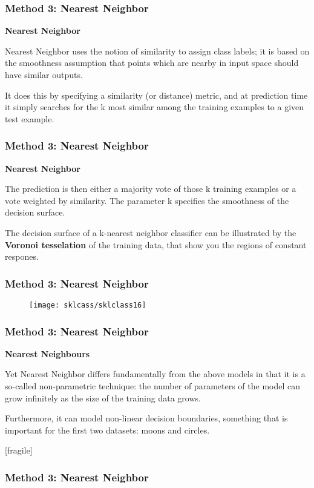 \documentclass[MASTER.tex]{subfiles}
\begin{document}
 

 
 \frametitle{Method 3: Nearest Neighbor}
 
\textbf{Nearest Neighbor}
 
\item Nearest Neighbor uses the notion of similarity to assign class labels; it is based on the smoothness assumption that points which are nearby in input space should have similar outputs.
\item  It does this by specifying a similarity (or distance) metric, and at prediction time it simply searches for the k most similar among the training examples to a given test example.
 
 

 
  \frametitle{Method 3: Nearest Neighbor}
  
 \textbf{Nearest Neighbor}
   
   The prediction is then either a majority vote of those k training examples or a vote weighted by similarity.  The parameter k specifies the smoothness of the decision surface.\item  The decision surface of a k-nearest neighbor classifier can be illustrated by the \textbf{Voronoi tesselation} of the training data, that show you the regions of constant respones.
 
 
 
  \frametitle{Method 3: Nearest Neighbor}
 \begin{figure}
  \centering
  \texttt{[image: sklcass/sklclass16]}
 
 \end{figure}
 
 
 
  \frametitle{Method 3: Nearest Neighbor}
   
 \textbf{Nearest Neighbours}
  
\item  Yet Nearest Neighbor differs fundamentally from the above models in that it is a so-called non-parametric technique: the number of parameters of the model can grow infinitely as the size of the training data grows. 
\item Furthermore, it can model non-linear decision boundaries, something that is important for the first two datasets: moons and circles.
  



 

 [fragile]
 \frametitle{Method 3: Nearest Neighbor}
  
\end{document}
